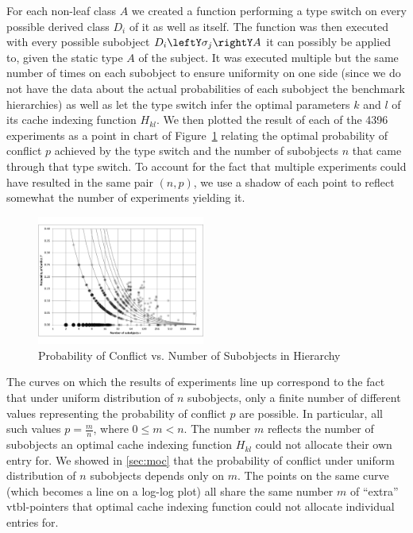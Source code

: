 For each non-leaf class $A$ we created a function performing a type switch on 
every possible derived class $D_i$ of it as well as itself. The function was 
then executed with every possible subobject $D_i\leftY\sigma_j\rightY A$ it can  
possibly be applied to, given the static type $A$ of the subject. It was 
executed multiple but the same number of times on each subobject to ensure 
uniformity on one side (since we do not have the data about the actual 
probabilities of each subobject the benchmark hierarchies) as well as let the 
type switch infer the optimal parameters $k$ and $l$ of its cache indexing 
function $H_{kl}$. We then plotted the result of each of the 4396 experiments as 
a point in chart of Figure~\ref{fig:prob} relating the optimal probability of 
conflict $p$ achieved by the type switch and the number of subobjects $n$ that 
came through that type switch. To account for the fact that multiple experiments
could have resulted in the same pair $(n,p)$, we use a shadow of each point to 
reflect somewhat the number of experiments yielding it.

\begin{figure}[htbp]
  \centering
    \includegraphics[width=0.49\textwidth]{ClassHierarchies.pdf}
  \caption{Probability of Conflict vs. Number of Subobjects in Hierarchy}
  \label{fig:prob}
\end{figure}

The curves on which the results of experiments line up correspond to the fact 
that under uniform distribution of $n$ subobjects, only a finite number of 
different values representing the probability of conflict $p$ are possible. In 
particular, all such values $p=\frac{m}{n}$, where $0 \le m < n$. The number $m$ 
reflects the number of subobjects an optimal cache indexing function $H_{kl}$ 
could not allocate their own entry for. We showed in \textsection\ref{sec:moc} 
that the probability of conflict under uniform distribution of $n$ subobjects 
depends only on $m$. The points on the same curve (which becomes a line on a
log-log plot) all share the same number $m$ of ``extra'' vtbl-pointers that optimal 
cache indexing function could not allocate individual entries for.

